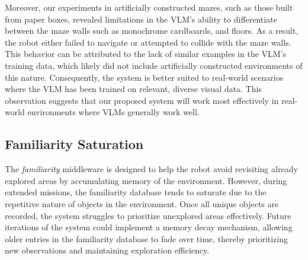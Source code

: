 
Moreover, our experiments in artificially constructed mazes, such as those built from paper boxes, revealed limitations in the VLM's ability to differentiate between the maze walls such as monochrome cardboards, and floors. As a result, the robot either failed to navigate or attempted to collide with the maze walls. This behavior can be attributed to the lack of similar examples in the VLM’s training data, which likely did not include artificially constructed environments of this nature. Consequently, the system is better suited to real-world scenarios where the VLM has been trained on relevant, diverse visual data. This observation suggests that our proposed system will work most effectively in real-world environments where VLMs generally work well.


\subsection{Familiarity Saturation}
\vspace{-1mm}
The \textit{familiarity} middleware is designed to help the robot avoid revisiting already explored areas by accumulating memory of the environment. However, during extended missions, the familiarity database tends to saturate due to the repetitive nature of objects in the environment. Once all unique objects are recorded, the system struggles to prioritize unexplored areas effectively. Future iterations of the system could implement a memory decay mechanism, allowing older entries in the familiarity database to fade over time, thereby prioritizing new observations and maintaining exploration efficiency.

